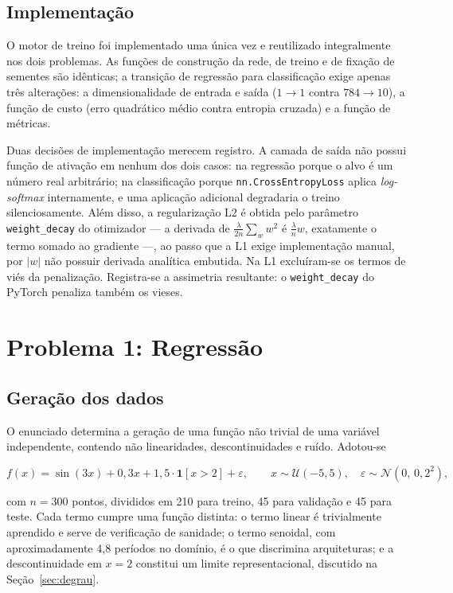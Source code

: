 \documentclass[11pt,a4paper]{article}
\begin{document}
\subsection{Implementação}

O motor de treino foi implementado uma única vez e reutilizado integralmente nos dois
problemas. As funções de construção da rede, de treino e de fixação de sementes são
idênticas; a transição de regressão para classificação exige apenas três alterações:
a dimensionalidade de entrada e saída ($1\to1$ contra $784\to10$), a função de custo
(erro quadrático médio contra entropia cruzada) e a função de métricas.

Duas decisões de implementação merecem registro. A camada de saída não possui função
de ativação em nenhum dos dois casos: na regressão porque o alvo é um número real
arbitrário; na classificação porque \texttt{nn.CrossEntropyLoss} aplica
\emph{log-softmax} internamente, e uma aplicação adicional degradaria o treino
silenciosamente. Além disso, a regularização L2 é obtida pelo parâmetro
\texttt{weight\_decay} do otimizador --- a derivada de
$\frac{\lambda}{2n}\sum_w w^2$ é $\frac{\lambda}{n}w$, exatamente o termo somado ao
gradiente ---, ao passo que a L1 exige implementação manual, por $|w|$ não possuir
derivada analítica embutida. Na L1 excluíram-se os termos de viés da penalização.
Registra-se a assimetria resultante: o \texttt{weight\_decay} do PyTorch penaliza
também os vieses.

\section{Problema 1: Regressão}

\subsection{Geração dos dados}

O enunciado determina a geração de uma função não trivial de uma variável
independente, contendo não linearidades, descontinuidades e ruído. Adotou-se

\begin{equation}
f(x) = \sin(3x) + 0{,}3x + 1{,}5\cdot\mathbf{1}[x>2] + \varepsilon,
\qquad x \sim \mathcal{U}(-5,5), \quad \varepsilon \sim \mathcal{N}(0,\,0{,}2^2),
\end{equation}

com $n=300$ pontos, divididos em 210 para treino, 45 para validação e 45 para teste.
Cada termo cumpre uma função distinta: o termo linear é trivialmente aprendido e serve
de verificação de sanidade; o termo senoidal, com aproximadamente 4{,}8 períodos no
domínio, é o que discrimina arquiteturas; e a descontinuidade em $x=2$ constitui um
limite representacional, discutido na Seção~\ref{sec:degrau}.
\end{document}
